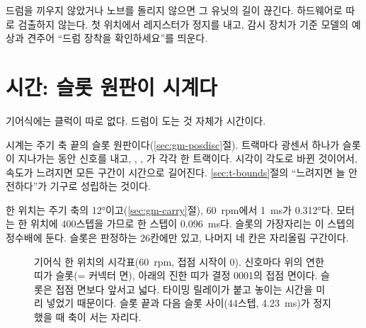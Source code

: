 드럼을 끼우지 않았거나 노브를 돌리지 않으면 그 유닛의 길이 끊긴다. 하드웨어로 따로 검출하지 않는다. 첫 위치에서
레지스터가 정지를 내고, 감시 장치가 기준 모델의 예상과 견주어 ``드럼 장착을 확인하세요''를 띄운다.

\section{시간: 슬롯 원판이 시계다}\label{sec:t-gear}

기어식에는 클럭이 따로 없다. 드럼이 도는 것 자체가 시간이다.

\Why 시계는 주기 축 끝의 슬롯 원판이다(\ref{sec:gm-posdisc}절). 트랙마다 광센서 하나가 슬롯이 지나가는 동안
신호를 내고, , , 가 각각 한 트랙이다. 시각이 각도로 바뀐 것이어서, 속도가
느려지면 모든 구간이 시간으로 길어진다. \ref{sec:t-bounds}절의 ``느려지면 늘 안전하다''가 기구로 성립하는 것이다.

한 위치는 주기 축의 12°이고(\ref{sec:gm-carry}절), 60~rpm에서 1~ms가 0.312°다. 모터는 한 위치에 400스텝을 가므로
한 스텝이 0.096~ms다. 슬롯의 가장자리는 이 스텝의 정수배에 둔다. 슬롯은 판정하는 26칸에만 있고, 나머지 네 칸은
자리올림 구간이다.

\begin{figure}[ht]
\centering
{}
\caption{기어식 한 위치의 시각표(60~rpm,  접점 시작이 0). 신호마다 위의 연한 띠가 슬롯(= 커넥터 면),
아래의 진한 띠가 결정 0001의 접점 면이다. 슬롯은 접점 면보다 앞서고 넓다. 타이밍 릴레이가 붙고 놓이는 시간을 미리 넣었기
때문이다.  슬롯 끝과 다음  슬롯 사이(44스텝, 4.23~ms)가 정지했을 때 축이 서는 자리다.}
\label{fig:t-slots}
\end{figure}

